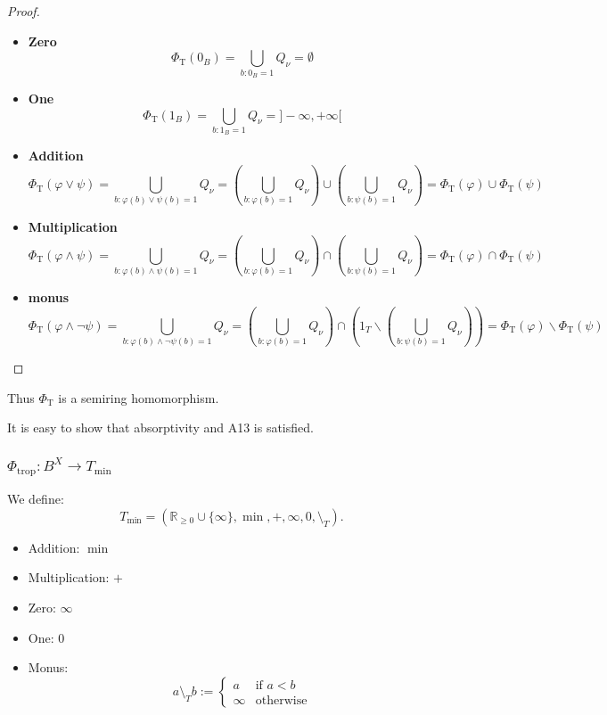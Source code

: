 \begin{proof}
\begin{itemize}
\item \textbf{Zero}
$$
\Phi_{\mathrm{T}}(0_B) = \bigcup_{b:0_B=1} Q_{\nu} = \emptyset
$$

\item
\textbf{One}
$$
\Phi_{\mathrm{T}}(1_B) = \bigcup_{b:1_B=1} Q_{\nu} = ]-\infty, +\infty[
$$
\item
\textbf{Addition}
$$
\Phi_{\mathrm{T}}(\varphi \lor \psi)
= \bigcup_{b: \varphi(b) \lor \psi(b) = 1} Q_{\nu}
= \left(\bigcup_{b: \varphi(b) = 1} Q_{\nu}\right) \cup \left(\bigcup_{b: \psi(b) = 1} Q_{\nu}\right)
= \Phi_{\mathrm{T}}(\varphi) \cup \Phi_{\mathrm{T}}(\psi)
$$
\item
\textbf{Multiplication}
$$
\Phi_{\mathrm{T}}(\varphi \land \psi)
= \bigcup_{b: \varphi(b) \land \psi(b) = 1} Q_{\nu}
= \left(\bigcup_{b: \varphi(b) = 1} Q_{\nu}\right) \cap \left(\bigcup_{b: \psi(b) = 1} Q_{\nu}\right)
= \Phi_{\mathrm{T}}(\varphi) \cap \Phi_{\mathrm{T}}(\psi)
$$
\item
\textbf{monus}
$$
\Phi_{\mathrm{T}}(\varphi \land \neg \psi)
= \bigcup_{b: \varphi(b) \land \neg \psi(b) = 1} Q_{\nu}
= \left(\bigcup_{b: \varphi(b) = 1} Q_{\nu}\right) \cap \left(1_T \backslash \left(\bigcup_{b: \psi(b) = 1} Q_{\nu}\right)\right)
= \Phi_{\mathrm{T}}(\varphi) \backslash \Phi_{\mathrm{T}}(\psi)
$$
    

\end{itemize}

\end{proof}

Thus $\Phi_{\mathrm{T}}$ is a semiring homomorphism.

It is easy to show that absorptivity and A13 is satisfied.

\subsubsection{$\Phi_{\mathrm{trop}}: B^X \to T_{\min}$}

We define:
$$
T_{\min} = (\mathbb{R}_{\ge 0} \cup \{\infty\},\min,+,\infty,0,\setminus_T).
$$
\begin{itemize}
    \item Addition: \(\min\)
    \item Multiplication: \(+\)
    \item Zero: \(\infty\)
    \item One: \(0\)
    \item Monus:
    \[
    a \setminus_T b :=
    \begin{cases}
        a & \text{if } a < b \\
        \infty & \text{otherwise}
    \end{cases}
    \]
\end{itemize}



